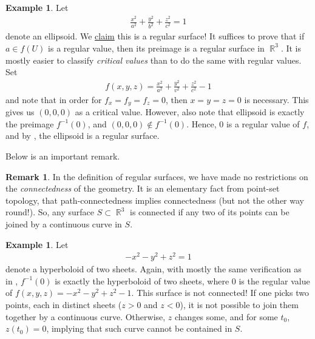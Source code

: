 \documentclass{amsart} %
\theoremstyle{mytheoremstyle}
\theoremstyle{definition}
\newtheorem{example}[definition]{Example}
\newtheorem{remark}[definition]{Remark}
\numberwithin{equation}{section}
\DeclareMathOperator{\R}{\mathbb{R}}
\DeclareMathOperator{\1}{\mathbbm{1}}
\begin{document}
\begin{example}
	\label{exampleellipsoid}
	Let
	\begin{align}
	\label{eqellipsoid}
	\frac{x^2}{a^2} + 	\frac{y^2}{b^2} + 	\frac{z^2}{c^2} = 1
	\end{align}
	denote an ellipsoid. We \uline{claim} this is a regular surface! It suffices to prove that if $a \in f(U)$ is a regular value, then its preimage is a regular surface in $\R^3$. It is mostly easier to classify \textit{critical values} than to do the same with regular values. Set
	\begin{align*}
	f(x,y,z) = \frac{x^2}{a^2} + 	\frac{y^2}{v^2} + 	\frac{z^2}{c^2} - 1
	\end{align*}
	and note that in order for $f_x = f_y = f_z = 0$, then $x=y=z=0$ is necessary. This gives us $(0,0,0)$ as a critical value. However, also note that ellipsoid is exactly the preimage $f^{-1}(0)$, and $(0,0,0 ) \notin f^{-1}(0)$. Hence, $0$ is a regular value of $f$, and by , the ellipsoid is a regular surface.
\end{example}

\noindent Below is an important remark.

\begin{remark}
	In the definition of regular surfaces, we have made no restrictions on the \textit{connectedness} of the geometry. It is an elementary fact from point-set topology, that path-connectedness implies connectedness (but not the other way round!). So, any surface $S \subset \R^3$ is connected if any two of its points can be joined by a continuous curve in $S$.
\end{remark}

\begin{example}
	\label{examplehyperboloidoftwosheets}
	Let
	\begin{align}
	\label{eqhyperboloidoftwosheets}
	-x^2-y^2+z^2 = 1
	\end{align}
	denote a hyperboloid of two sheets. Again, with mostly the same verification as in , $f^{-1}(0)$ is exactly the hyperboloid of two sheets, where $0$ is the regular value of $f(x,y,z) = -x^2-y^2+z^2 -1$. This surface is not connected! If one picks two points, each in distinct sheets ($z>0 $ and $z<0$), it is not possible to join  them together by a continuous curve. Otherwise, $z$ changes some, and for some $t_0$, $z(t_0) =0$, implying that such curve cannot be contained in $S$.
\end{example}
\end{document}
